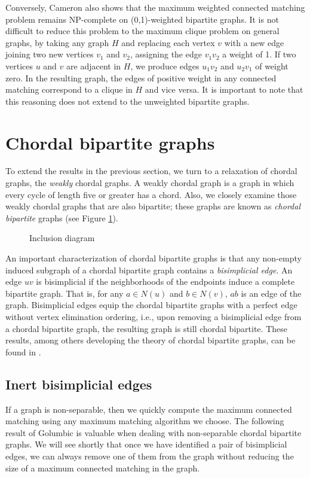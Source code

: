 Conversely, Cameron also shows that the maximum weighted connected matching problem remains NP-complete on (0,1)-weighted bipartite graphs.  
%
It is not difficult to reduce this problem to the maximum clique problem on general graphs,  
%
by taking any graph $H$ and replacing each vertex $v$ with a new edge joining two new vertices $v_1$ and $v_2$, assigning the edge $v_1v_2$ a weight of 1.  
%
If two vertices $u$ and $v$ are adjacent in $H$, we produce edges $u_1v_2$ and $u_2v_1$ of weight zero.
%  
In the resulting graph, the edges of positive weight in any connected matching correspond to a clique in $H$ and vice versa.
%
It is important to note that this reasoning does not extend to the unweighted bipartite graphs.  



\section{Chordal bipartite graphs}

To extend the results in the previous section, we turn to a relaxation of chordal graphs, the {\it weakly} chordal graphs. 
%
A weakly chordal graph is a graph in which every cycle of length five or greater has a chord.  
%
Also, we closely examine those weakly chordal graphs that are also bipartite; these graphs are known as {\it chordal bipartite} graphs (see Figure \ref{inclusion}).  
\begin{figure}
	\begin{center}
		
	\end{center}
	\label{inclusion}
	\caption{Inclusion diagram}
\end{figure}

An important characterization of chordal bipartite graphs is that any non-empty induced subgraph of a chordal bipartite graph contains a {\it bisimplicial edge}.  
%
An edge $uv$ is bisimplicial if the neighborhoods of the endpoints induce a complete bipartite graph.  
%
That is, for any $a\in N(u)$ and $b\in N(v)$, $ab$ is an edge of the graph.  
%
Bisimplicial edges equip the chordal bipartite graphs with a perfect edge without vertex elimination ordering, i.e., upon removing a bisimplicial edge from a chordal bipartite graph, the resulting graph is still chordal bipartite.  These results, among others developing the theory of chordal bipartite graphs, can be found in \cite{Gol_Goss}.

\subsection{Inert bisimplicial edges}
If a graph is non-separable, then we quickly compute the maximum connected matching using any maximum matching algorithm we choose.  
%
The following result of Golumbic \cite{Golumbic} is valuable when dealing with non-separable chordal bipartite graphs.
%
%
We will see shortly that once we have identified a pair of bisimplicial edges, we can always remove one of them from the graph without reducing the size of a maximum connected matching in the graph.  
%

